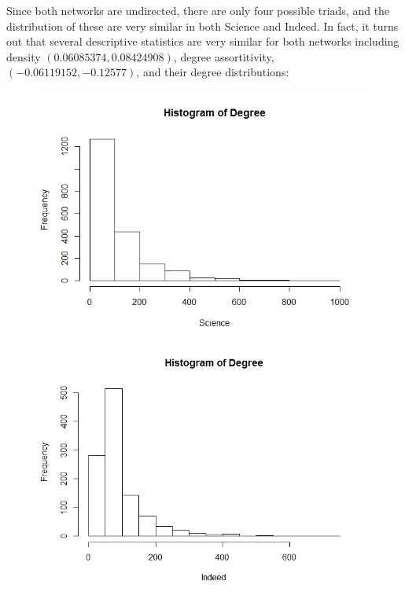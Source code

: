 \documentclass[12pt]{article}
\begin{document}
\noindent Since both networks are undirected, there are only four possible triads, and the distribution of these are very similar in both Science and Indeed. In fact, it turns out that several descriptive statistics are very similar for both networks including density $(0.06085374, 0.08424908)$, degree assortitivity, $(-0.06119152, -0.12577)$, and their degree distributions:
\vspace{2mm}
\begin{figure}[H]
	\centering
	\includegraphics[scale=0.4]{Images/degree_hist_sci.jpeg}
	\includegraphics[scale=0.4]{Images/degree_hist_ind.jpeg}
\end{figure}
\vspace{2mm} 
\end{document}
